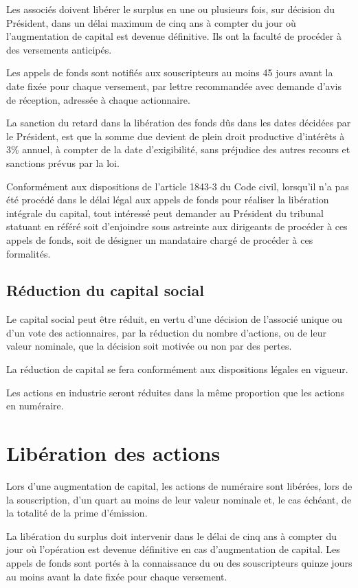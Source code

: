 \documentclass[a4paper,12pt]{report}
\begin{document}
Les associés doivent libérer le surplus en une ou plusieurs fois, sur décision du Président, 
dans un délai maximum de cinq ans à compter du jour où l'augmentation de capital est devenue définitive. 
Ils ont la faculté de procéder à des versements anticipés.

Les appels de fonds sont notifiés aux souscripteurs au moins 45 jours avant la date fixée pour chaque versement, 
par lettre recommandée avec demande d'avis de réception, adressée à chaque actionnaire.

La sanction du retard dans la libération des fonds dûs dans les dates décidées par le Président, 
est que la somme due devient de plein droit productive d'intérêts à 3\% annuel, à compter de la date d'exigibilité, 
sans préjudice des autres recours et sanctions prévus par la loi.

Conformément aux dispositions de l'article 1843-3 du Code civil, lorsqu'il n'a pas été procédé dans le délai légal aux appels de fonds 
pour réaliser la libération intégrale du capital, tout intéressé peut demander au Président du tribunal statuant en référé soit d'enjoindre sous astreinte 
aux dirigeants de procéder à ces appels de fonds, soit de désigner un mandataire chargé de procéder à ces formalités.

\subsection{Réduction du capital social}

Le capital social peut être réduit, en vertu d'une décision de l'associé unique ou d'un vote des actionnaires, par la réduction du nombre d'actions, 
ou de leur valeur nominale, que la décision soit motivée ou non par des pertes.

La réduction de capital se fera conformément aux dispositions légales en vigueur.

Les actions en industrie seront réduites dans la même proportion que les actions en numéraire.

\section{Libération des actions}
Lors d'une augmentation de capital, les actions de numéraire sont libérées, lors de la souscription, 
d'un quart au moins de leur valeur nominale et, le cas échéant, de la totalité de la prime d'émission.

La libération du surplus doit intervenir dans le délai de cinq ans à compter du jour où l'opération est devenue définitive en cas d'augmentation de capital. 
Les appels de fonds sont portés à la connaissance du ou des souscripteurs quinze jours au moins avant la date fixée pour chaque versement.
\end{document}
